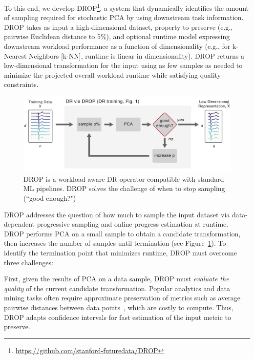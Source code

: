To this end, we develop DROP\footnote{\href{https://github.com/stanford-futuredata/DROP}{https://github.com/stanford-futuredata/DROP}}, a system that dynamically identifies the amount of sampling required for stochastic PCA by using downstream task information.
DROP takes as input a high-dimensional dataset,
property to preserve (e.g., pairwise Euclidean distance to 5\%), and optional runtime model expressing downstream workload performance as a function of dimensionality (e.g., for k-Nearest Neighbors [k-NN], runtime is linear in dimensionality). 
DROP returns a low-dimensional transformation for the input using as few samples as needed to minimize the projected overall workload runtime while satisfying quality constraints.

\begin{figure}
\includegraphics[width=\linewidth]{figs/basic.pdf}
\caption[]{DROP is a workload-aware DR operator compatible with standard ML pipelines. DROP solves the challenge of when to stop sampling (``good enough?")}
\label{fig:basic}
\end{figure}

DROP addresses the question of how much to sample the input dataset via data-dependent progressive sampling and online progress estimation at runtime.  
DROP performs PCA on a small sample to obtain a candidate transformation, then increases the number of samples until termination (see Figure~\ref{fig:basic}). 
To identify the termination point that minimizes runtime, DROP must overcome three challenges:

First, given the results of PCA on a data sample, DROP must \emph{evaluate the quality} of the current candidate transformation.
Popular analytics and data mining tasks often require approximate preservation of metrics such as average pairwise distances between data points~\cite{time-series-dm,dm-book}, which are costly to compute.
Thus, DROP adapts confidence intervals for fast estimation of the input metric to preserve.


